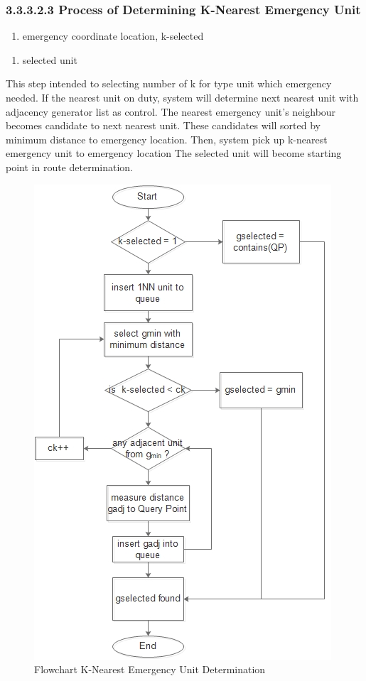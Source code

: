 \subsubsection{3.3.3.2.3 Process of Determining K-Nearest Emergency Unit}
\begin{enumerate}[label=Input\hspace{5mm} :\hspace{2mm}, leftmargin=*, topsep=0pt, itemsep=-1ex, parsep=1ex]
\item emergency coordinate location, k-selected
\end{enumerate}
\begin{enumerate}[label=Output\hspace{2mm} :\hspace{2mm}, leftmargin=*, topsep=0pt, itemsep=-1ex, parsep=1ex]
\item selected unit
\end{enumerate}
This step intended to selecting number of k for type unit which emergency needed. If the nearest unit on duty, system will determine next nearest unit with adjacency generator list as control. The nearest emergency unit's neighbour becomes candidate to next nearest unit. These candidates will sorted by minimum distance to emergency location. Then, system pick up k-nearest emergency unit to emergency location The selected unit will become starting point in route determination.

\begin{figure}[H]
    \centering
    \includegraphics[scale=0.56]{flowchart_knn.jpg}
    \caption{Flowchart K-Nearest Emergency Unit Determination}
    \label{fig:bp_pol}
\end{figure}

